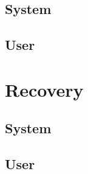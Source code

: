     \subsection{System} 
    
    \subsection{User} 
    
    \section{Recovery}
  
    \subsection{System} 
    
    \subsection{User} 